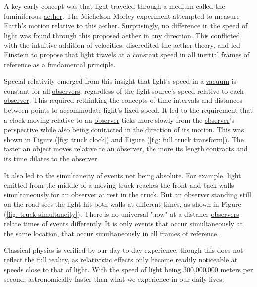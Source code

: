 A key early concept was that light traveled through a medium called the luminiferous \hyperlink{def-aether}{aether}.
The Michelson-Morley experiment attempted to measure Earth's motion relative to this \hyperlink{def-aether}{aether}.
Surprisingly, no difference in the speed of light was found through this proposed \hyperlink{def-aether}{aether} in any direction.
This conflicted with the intuitive addition of velocities, discredited the \hyperlink{def-aether}{aether} theory, and led Einstein to propose that light travels at a constant speed in all inertial frames of reference as a fundamental principle.

Special relativity emerged from this insight that light's speed in a \hyperlink{def-vacuum}{vacuum} is constant for all \hyperlink{def-observer}{observers}, regardless of the light source's speed relative to each \hyperlink{def-observer}{observer}.
This required rethinking the concepts of time intervals and distances between points to accommodate light's fixed speed.
It led to the requirement that a clock moving relative to an \hyperlink{def-observer}{observer} ticks more slowly from the \hyperlink{def-observer}{observer}'s perspective while also being contracted in the direction of its motion.
This was shown in Figure (\ref{fig: truck clock}) and Figure (\ref{fig: full truck transform}).
The faster an object moves relative to an \hyperlink{def-observer}{observer}, the more its length contracts and its time dilates to the \hyperlink{def-observer}{observer}.

It also led to the \hyperlink{def-simultaneity}{simultaneity} of \hyperlink{def-event}{events} not being absolute.
For example, light emitted from the middle of a moving truck reaches the front and back walls \hyperlink{def-simultaneity}{simultaneously} for an \hyperlink{def-observer}{observer} at rest in the truck.
But an \hyperlink{def-observer}{observer} standing still on the road sees the light hit both walls at different times, as shown in Figure (\ref{fig: truck simultaneity}).
There is no universal "now" at a distance-\hyperlink{def-observer}{observers} relate times of \hyperlink{def-event}{events} differently.
It is only \hyperlink{def-event}{events} that occur \hyperlink{def-simultaneity}{simultaneously} at the same location, that occur \hyperlink{def-simultaneity}{simultaneously} in all frames of reference.

Classical physics is verified by our day-to-day experience, though this does not reflect the full reality, as relativistic effects only become readily noticeable at speeds close to that of light.
With the speed of light being 300,000,000 meters per second, astronomically faster than what we experience in our daily lives.

